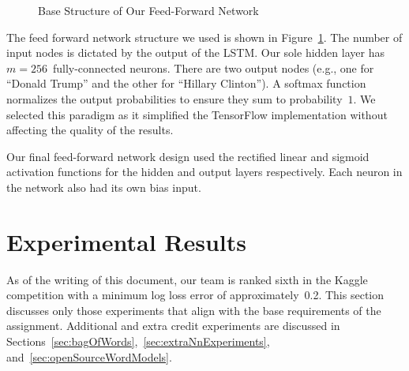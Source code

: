 \documentclass{report}
\begin{document}
\begin{figure}
    \caption{Base Structure of Our Feed-Forward Network}\label{fig:feedForwardNet}
  \end{figure}
  
  The feed forward network structure we used is shown in Figure~\ref{fig:feedForwardNet}.  The number of input nodes is dictated by the output of the LSTM.  Our sole hidden layer has ${m=256}$~fully-connected neurons. There are two output nodes (e.g., one for ``Donald Trump'' and the other for ``Hillary Clinton'').  A softmax function normalizes the output probabilities to ensure they sum to probability~$1$.  We selected this paradigm as it simplified the TensorFlow implementation without affecting the quality of the results.
  
  Our final feed-forward network design used the rectified linear and sigmoid activation functions for the hidden and output layers respectively.  Each neuron in the network also had its own bias input.
  
  \section{Experimental Results} \label{sec:experimentalResults}
  
  As of the writing of this document, our team is ranked sixth in the Kaggle competition with a minimum log loss error of approximately~0.2. This section discusses only those experiments that align with the base requirements of the assignment.  Additional and extra credit experiments are discussed in Sections~\ref{sec:bagOfWords},~\ref{sec:extraNnExperiments}, and~\ref{sec:openSourceWordModels}.
  
\end{document}
